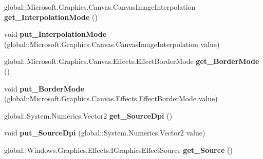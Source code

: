 \begin{DoxyCompactItemize}
global\+::\+Microsoft.\+Graphics.\+Canvas.\+Canvas\+Image\+Interpolation {\bfseries get\+\_\+\+Interpolation\+Mode} ()
\item 
\mbox{\label{class_microsoft_1_1_graphics_1_1_canvas_1_1_effects_1_1_dpi_compensation_effect_ab95d5e8e9e140918df664c046fe70e53}} 
void {\bfseries put\+\_\+\+Interpolation\+Mode} (global\+::\+Microsoft.\+Graphics.\+Canvas.\+Canvas\+Image\+Interpolation value)
\item 
\mbox{\label{class_microsoft_1_1_graphics_1_1_canvas_1_1_effects_1_1_dpi_compensation_effect_a5640110355a62fb5ce7b280be6b2ead4}} 
global\+::\+Microsoft.\+Graphics.\+Canvas.\+Effects.\+Effect\+Border\+Mode {\bfseries get\+\_\+\+Border\+Mode} ()
\item 
\mbox{\label{class_microsoft_1_1_graphics_1_1_canvas_1_1_effects_1_1_dpi_compensation_effect_a2dbdf38c149aa690fe383653db643db6}} 
void {\bfseries put\+\_\+\+Border\+Mode} (global\+::\+Microsoft.\+Graphics.\+Canvas.\+Effects.\+Effect\+Border\+Mode value)
\item 
\mbox{\label{class_microsoft_1_1_graphics_1_1_canvas_1_1_effects_1_1_dpi_compensation_effect_aba9725fe6d69bf324f59bb8c77745665}} 
global\+::\+System.\+Numerics.\+Vector2 {\bfseries get\+\_\+\+Source\+Dpi} ()
\item 
\mbox{\label{class_microsoft_1_1_graphics_1_1_canvas_1_1_effects_1_1_dpi_compensation_effect_ae562d1d30976c9ba693a67de919e272a}} 
void {\bfseries put\+\_\+\+Source\+Dpi} (global\+::\+System.\+Numerics.\+Vector2 value)
\item 
\mbox{\label{class_microsoft_1_1_graphics_1_1_canvas_1_1_effects_1_1_dpi_compensation_effect_ad4e3622fd4c21cbed4bbc30f5bca8e6c}} 
global\+::\+Windows.\+Graphics.\+Effects.\+I\+Graphics\+Effect\+Source {\bfseries get\+\_\+\+Source} ()
\item 

\end{DoxyCompactItemize}
